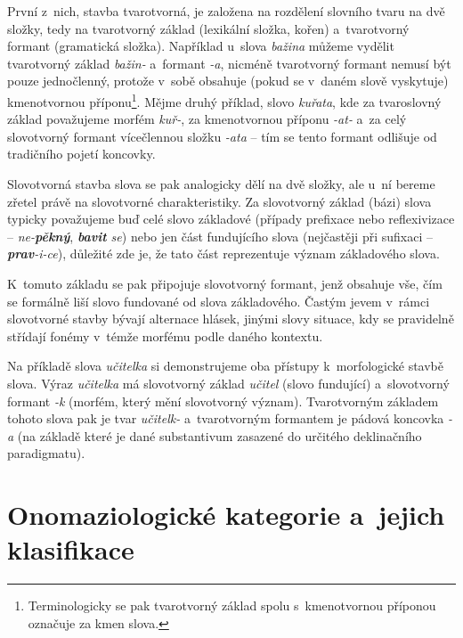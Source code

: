 První z~nich, stavba tvarotvorná, je založena na rozdělení slovního
tvaru na dvě složky, tedy na tvarotvorný základ (lexikální složka,
kořen) a~tvarotvorný formant (gramatická složka). Například u~slova
\emph{bažina} můžeme vydělit tvarotvorný základ \emph{bažin-} a~formant
\emph{-a}, nicméně tvarotvorný formant nemusí být pouze jednočlenný,
protože v~sobě obsahuje (pokud se v~daném slově vyskytuje) kmenotvornou
příponu\footnote{Terminologicky se pak tvarotvorný základ spolu s~kmenotvornou příponou označuje za kmen slova.}.
Mějme druhý příklad, slovo \emph{kuřata}, kde za tvaroslovný základ
považujeme morfém \emph{kuř-}, za kmenotvornou příponu \emph{-at-} a~za
celý slovotvorný formant vícečlennou složku \emph{-ata} -- tím se tento
formant odlišuje od tradičního pojetí koncovky.
\parencite{enc-tvar-zaklad17}

Slovotvorná stavba slova se pak analogicky dělí na dvě složky, ale u~ní
bereme zřetel právě na slovotvorné charakteristiky. Za slovotvorný
základ (bázi) slova typicky považujeme buď celé slovo základové (případy
prefixace nebo reflexivizace -- \emph{ne-\textbf{pěkný}},
\emph{\textbf{bavit} se}) nebo jen část fundujícího slova (nejčastěji
při sufixaci -- \emph{\textbf{prav}-i-ce}), důležité zde je, že tato
část reprezentuje význam základového slova.
\parencite{enc-slov-zaklad17}

K~tomuto základu se pak připojuje slovotvorný formant, jenž obsahuje
vše, čím se formálně liší slovo fundované od slova základového. Častým
jevem v~rámci slovotvorné stavby bývají alternace hlásek, jinými slovy
situace, kdy se pravidelně střídají fonémy v~témže morfému podle daného
kontextu.~\parencite[97]{dokulil00}

Na příkladě slova \emph{učitelka} si demonstrujeme oba přístupy
k~morfologické stavbě slova. Výraz \emph{učitelka} má slovotvorný základ
\emph{učitel} (slovo fundující) a~slovotvorný formant \emph{-k} (morfém,
který mění slovotvorný význam). Tvarotvorným základem tohoto slova pak
je tvar \emph{učitelk-} a~tvarotvorným formantem je pádová koncovka
\emph{-a} (na základě které je dané substantivum zasazené do určitého
deklinačního paradigmatu).

\hypertarget{onomaziologickuxe9-kategorie-a-jejich-klasifikace}{%
\section{Onomaziologické kategorie a~jejich
klasifikace}\label{onomaziologickuxe9-kategorie-a-jejich-klasifikace}}


